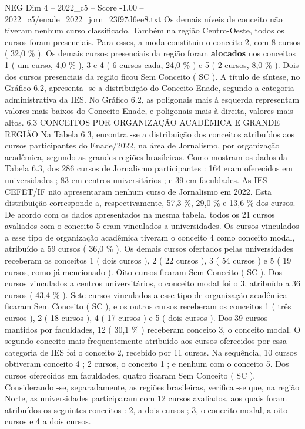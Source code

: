 \begin{textsample}{NEG Dim 4 – 2022\_c5 – Score -1.00 – 2022\_c5/enade\_2022\_jorn\_23f97d6ee8.txt}
Os demais níveis de conceito não tiveram nenhum curso classificado.
Também na região Centro-Oeste, todos os cursos foram presenciais.
Para esses, a moda constituiu o conceito 2, com 8 cursos ( 32,0 \% ).
Os demais cursos presenciais da região foram \textbf{alocados} nos conceitos 1 ( um curso, 4,0 \% ), 3 e 4 ( 6 cursos cada, 24,0 \% ) e 5 ( 2 cursos, 8,0 \% ).
Dois dos cursos presenciais da região ficou Sem Conceito ( SC ).
A título de síntese, no Gráfico 6.2, apresenta -se a distribuição do Conceito Enade, segundo a categoria administrativa da IES.
No Gráfico 6.2, as poligonais mais à esquerda representam valores mais baixos do Conceito Enade, e poligonais mais à direita, valores mais altos. 6.3 CONCEITOS POR ORGANIZAÇÃO ACADÊMICA E GRANDE REGIÃO Na Tabela 6.3, encontra -se a distribuição dos conceitos atribuídos aos cursos participantes do Enade/2022, na área de Jornalismo, por organização acadêmica, segundo as grandes regiões brasileiras.
Como mostram os dados da Tabela 6.3, dos 286 cursos de Jornalismo participantes : 164 eram oferecidos em universidades ; 83 em centros universitários ; e 39 em faculdades.
As IES CEFET/IF não apresentaram nenhum curso de Jornalismo em 2022.
Esta distribuição corresponde a, respectivamente, 57,3 \%, 29,0 \% e 13,6 \% dos cursos.
De acordo com os dados apresentados na mesma tabela, todos os 21 cursos avaliados com o conceito 5 eram vinculados a universidades.
Os cursos vinculados a esse tipo de organização acadêmica tiveram o conceito 4 como conceito modal, atribuído a 59 cursos ( 36,0 \% ).
Os demais cursos ofertados pelas universidades receberam os conceitos 1 ( dois cursos ), 2 ( 22 cursos ), 3 ( 54 cursos ) e 5 ( 19 cursos, como já mencionado ).
Oito cursos ficaram Sem Conceito ( SC ).
Dos cursos vinculados a centros universitários, o conceito modal foi o 3, atribuído a 36 cursos ( 43,4 \% ).
Sete cursos vinculados a esse tipo de organização acadêmica ficaram Sem Conceito ( SC ), e os outros cursos receberam os conceitos 1 ( três cursos ), 2 ( 18 cursos ), 4 ( 17 cursos ) e 5 ( dois cursos ).
Dos 39 cursos mantidos por faculdades, 12 ( 30,1 \% ) receberam conceito 3, o conceito modal.
O segundo conceito mais frequentemente atribuído aos cursos oferecidos por essa categoria de IES foi o conceito 2, recebido por 11 cursos.
Na sequência, 10 cursos obtiveram conceito 4 ; 2 cursos, o conceito 1 ; e nenhum com o conceito 5.
Dos cursos oferecidos em faculdades, quatro ficaram Sem Conceito ( SC ).
Considerando -se, separadamente, as regiões brasileiras, verifica -se que, na região Norte, as universidades participaram com 12 cursos avaliados, aos quais foram atribuídos os seguintes conceitos : 2, a dois cursos ; 3, o conceito modal, a oito cursos e 4 a dois cursos.

\end{textsample}
